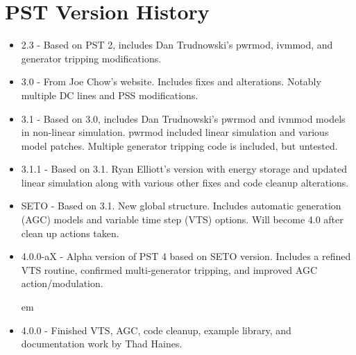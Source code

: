 \chapter{PST Version History}



\begin{itemize}
 em
\item 2.3 - Based on PST 2, includes Dan Trudnowski's pwrmod, ivmmod, and generator tripping modifications.
\item 3.0 - From Joe Chow's website. 
Includes fixes and alterations. 
Notably multiple DC lines and PSS modifications.
\item 3.1 - Based on 3.0, includes Dan Trudnowski's pwrmod and ivmmod models in non-linear simulation. 
pwrmod included linear simulation and various model patches. 
Multiple generator tripping code is included, but untested.
\item 3.1.1 - Based on 3.1. Ryan Elliott's version with energy storage and updated linear simulation along with various other fixes and code cleanup alterations. 
\item SETO - Based on 3.1. New global structure. 
Includes automatic generation (AGC) models and variable time step (VTS) options. Will become 4.0 after clean up actions taken.
\item 4.0.0-aX - Alpha version of PST 4 based on SETO version. 
Includes a refined VTS routine, confirmed multi-generator tripping, and improved AGC action/modulation.


 em
\item 4.0.0 - Finished VTS, AGC, code cleanup, example library, and documentation work by Thad Haines.
\end{itemize}